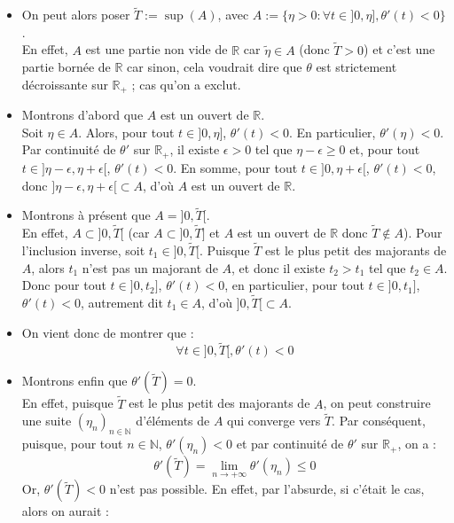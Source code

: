 \documentclass[9pt,a4paper]{article}
\begin{document}
\begin{itemize}[label=\textbullet]
\begin{itemize}[label=\textbullet]
\begin{itemize}[label=\textbullet]
            \item On peut alors poser $\tilde{T} := \sup(A)$, avec $A := \{\eta > 0 : \forall t \in ]0, \eta], \theta'(t) < 0\}$.\\
            En effet, $A$ est une partie non vide de $\mathbb{R}$ car $\tilde{\eta} \in A$ (donc $\tilde{T} > 0$) et c'est une partie bornée de $\mathbb{R}$ car sinon, cela voudrait dire que $\theta$ est strictement décroissante sur $\mathbb{R}_+$ ; cas qu'on a exclut.
            \item Montrons d'abord que $A$ est un ouvert de $\mathbb{R}$.\\
            Soit $\eta \in A$. Alors, pour tout $t \in ]0, \eta]$, $\theta'(t) < 0$. En particulier, $\theta'(\eta) < 0$. Par continuité de $\theta'$ sur $\mathbb{R}_+$, il existe $\epsilon > 0$ tel que $\eta - \epsilon \geq 0$ et, pour tout $t \in ]\eta - \epsilon, \eta + \epsilon[$, $\theta'(t) < 0$. En somme, pour tout $t \in ]0, \eta + \epsilon[$, $\theta'(t) < 0$, donc $]\eta - \epsilon, \eta + \epsilon[ \subset A$, d'où $A$ est un ouvert de $\mathbb{R}$.
            \item Montrons à présent que $A = ]0, \tilde{T}[$.\\
            En effet, $A \subset ]0, \tilde{T}[$ (car $A \subset ]0, \tilde{T}]$ et $A$ est un ouvert de $\mathbb{R}$ donc $\tilde{T} \notin A$). Pour l'inclusion inverse, soit $t_1 \in ]0, \tilde{T}[$. Puisque $\tilde{T}$ est le plus petit des majorants de $A$, alors $t_1$ n'est pas un majorant de $A$, et donc il existe $t_2 > t_1$ tel que $t_2 \in A$. Donc pour tout $t \in ]0, t_2]$, $\theta'(t) < 0$, en particulier, pour tout $t \in ]0, t_1]$, $\theta'(t) < 0$, autrement dit $t_1 \in A$, d'où $]0, \tilde{T}[ \subset A$.
            \item On vient donc de montrer que :
            $$
            \forall t \in ]0, \tilde{T}[, \theta'(t) < 0
            $$
            \item Montrons enfin que $\theta'(\tilde{T}) = 0$.\\
            En effet, puisque $\tilde{T}$ est le plus petit des majorants de $A$, on peut construire une suite $(\eta_n)_{n \in \mathbb{N}}$ d'éléments de $A$ qui converge vers $\tilde{T}$. Par conséquent, puisque, pour tout $n \in \mathbb{N}$, $\theta'(\eta_n) < 0$ et par continuité de $\theta'$ sur $\mathbb{R}_+$, on a :
            $$
            \theta'(\tilde{T}) = \lim_{n \to +\infty}\theta'(\eta_n) \leq 0
            $$
            Or, $\theta'(\tilde{T}) < 0$ n'est pas possible. En effet, par l'absurde, si c'était le cas, alors on aurait :

\end{itemize}
\end{itemize}
\end{itemize}
\end{document}
